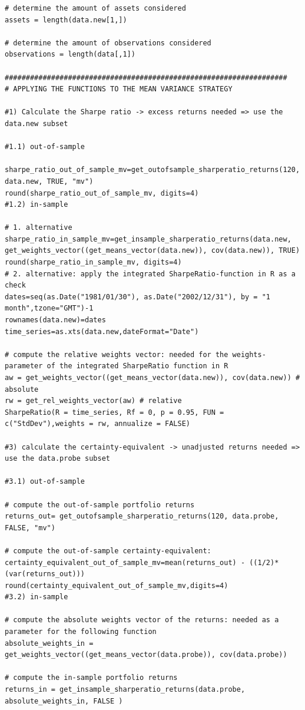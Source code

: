 \documentclass{article}
\begin{document}
\begin{lstlisting}[caption={This listing shows the entire code developed in R.}, label=code:1,frame=single]
# determine the amount of assets considered
assets = length(data.new[1,])

# determine the amount of observations considered
observations = length(data[,1])

###################################################################
# APPLYING THE FUNCTIONS TO THE MEAN VARIANCE STRATEGY

#1) Calculate the Sharpe ratio -> excess returns needed => use the data.new subset

#1.1) out-of-sample

sharpe_ratio_out_of_sample_mv=get_outofsample_sharperatio_returns(120, data.new, TRUE, "mv")
round(sharpe_ratio_out_of_sample_mv, digits=4)
#1.2) in-sample

# 1. alternative
sharpe_ratio_in_sample_mv=get_insample_sharperatio_returns(data.new, get_weights_vector((get_means_vector(data.new)), cov(data.new)), TRUE)
round(sharpe_ratio_in_sample_mv, digits=4)
# 2. alternative: apply the integrated SharpeRatio-function in R as a check
dates=seq(as.Date("1981/01/30"), as.Date("2002/12/31"), by = "1 month",tzone="GMT")-1
rownames(data.new)=dates
time_series=as.xts(data.new,dateFormat="Date")

# compute the relative weights vector: needed for the weights-parameter of the integrated SharpeRatio function in R
aw = get_weights_vector((get_means_vector(data.new)), cov(data.new)) # absolute
rw = get_rel_weights_vector(aw) # relative
SharpeRatio(R = time_series, Rf = 0, p = 0.95, FUN = c("StdDev"),weights = rw, annualize = FALSE)

#3) calculate the certainty-equivalent -> unadjusted returns needed => use the data.probe subset

#3.1) out-of-sample 

# compute the out-of-sample portfolio returns
returns_out= get_outofsample_sharperatio_returns(120, data.probe, FALSE, "mv")

# compute the out-of-sample certainty-equivalent:
certainty_equivalent_out_of_sample_mv=mean(returns_out) - ((1/2)*(var(returns_out)))
round(certainty_equivalent_out_of_sample_mv,digits=4)
#3.2) in-sample

# compute the absolute weights vector of the returns: needed as a parameter for the following function
absolute_weights_in = get_weights_vector((get_means_vector(data.probe)), cov(data.probe))

# compute the in-sample portfolio returns
returns_in = get_insample_sharperatio_returns(data.probe, absolute_weights_in, FALSE )


\end{lstlisting}
\end{document}
